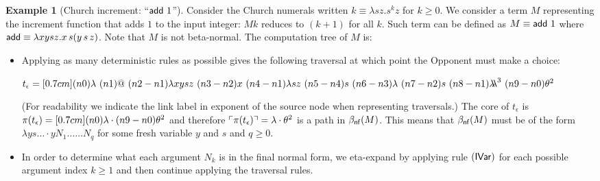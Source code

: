 \documentclass{article}
\theoremstyle{plain}
\theoremstyle{definition}
\newtheorem{example}{Example}[section]
\theoremstyle{remark}
\newcommand{\ghostlmd}{{\lambda\!\!\lambda}}
\newcommand{\ghostvar}{\theta}
\def\coresymbol{\pi} %
\newcommand{\core}[1]{\coresymbol(#1)} %
\begin{document}
\begin{example}[Church increment: ``${\sf add}\ 1$'']
Consider the Church numerals written $k \equiv\lambda s z . s^k z$ for $k\geq0$. We consider a term $M$ representing the increment function that adds $1$ to the input integer: $M k$ reduces to $(k+1)$ for all $k$. Such term can be defined as $M \equiv{\sf add}\ 1$ where
${\sf add} \equiv \lambda x y s z. x\, s (y\, s\, z)$.
Note that $M$ is not beta-normal.
The computation tree of $M$ is:

\begin{itemize}
\item Applying as many deterministic rules as possible gives the following traversal at which point the Opponent must make a choice:

$t_\epsilon = \Pstr[0.7cm]{(n0){\lambda }\ (n1){@}\ (n2-n1){\lambda x y s z}\ (n3-n2){x}\ (n4-n1){\lambda s z}\ (n5-n4){s}\ (n6-n3){\lambda }\ (n7-n2){s}\ (n8-n1){\ghostlmd^3}\ (n9-n0){\ghostvar^2} }$

(For readability we indicate the link label in exponent of the source node when representing traversals.)
The core of $t_\epsilon$ is
$\core{t_\epsilon} = \Pstr[0.7cm]{(n0){\lambda} \cdot (n9-n0){{\ghostvar^2}} }$
and therefore $\pview{\core{t_\epsilon}} =  \lambda\cdot \ghostvar^2$ is a path in  $\beta_{\sf nf}(M)$.
This means that $\beta_{\sf nf}(M)$ must be of the form $\lambda y s \ldots \cdot y N_1 \ldots \ldots N_q$ for some fresh variable $y$ and $s$ and $q\geq0$.

\item In order to determine what each argument $N_k$ is in the final normal form, we eta-expand by applying rule $\mathbf{({\sf IVar})}$ for each possible argument index $k\geq 1$ and then continue applying the traversal rules.


\end{itemize}
\end{example}
\end{document}
